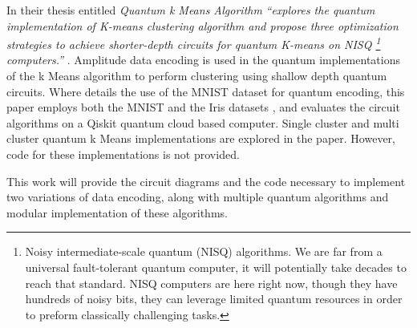 In their thesis entitled \emph{Quantum k Means Algorithm} \citeauthor{Khan2019} \emph{``explores the quantum implementation of K-means clustering algorithm and propose three optimization strategies to achieve shorter-depth circuits for quantum K-means on NISQ \citep{NISQ} \footnote{Noisy intermediate-scale quantum (NISQ) algorithms. We are far from a universal fault-tolerant quantum computer, it will potentially take decades to reach that standard. NISQ computers are here right now, though they have hundreds of noisy bits, they can leverage limited quantum resources in order to preform classically challenging tasks. }  computers.''} \citep{Khan2019}.
Amplitude data encoding is used in the quantum implementations of the k Means algorithm to perform clustering using shallow depth quantum circuits. Where \citeauthor{softIntro} details the use of the MNIST dataset for quantum encoding, this paper employs both the MNIST and the Iris datasets \citep{IrisDataset}, and evaluates the circuit algorithms on a Qiskit \citep{Qiskit-koch2019introduction} quantum cloud based computer.
Single cluster and multi cluster quantum k Means implementations are explored in the paper. %
However, code for these implementations is not provided.

This work will provide the circuit diagrams and the code necessary to implement two variations of data encoding, along with multiple quantum algorithms and modular implementation of these algorithms.






